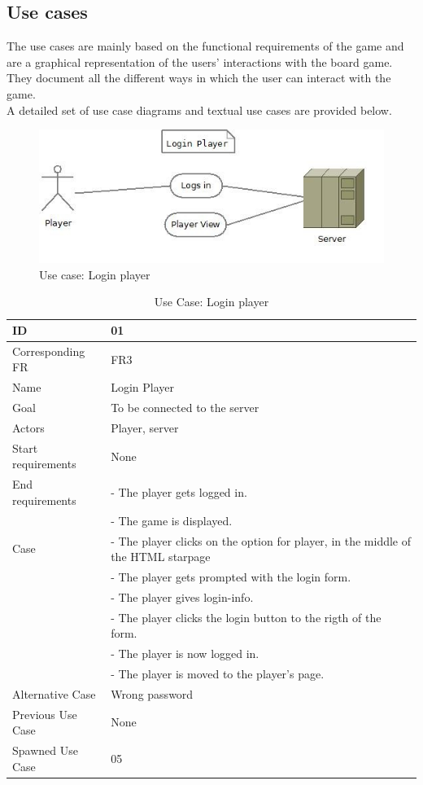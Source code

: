 \subsection{Use cases}
The use cases are mainly based on the functional requirements of the game and are a graphical representation of the users’ interactions with the board game. They document all the different ways in which the user can interact with the game. 
\\
A detailed set of use case diagrams and textual use cases are provided below.\\


\begin{figure}[H]
  \centering
    \includegraphics[width=1.0\textwidth]{img/loginplayer.jpg}
  \caption{Use case: Login player} 
  \label{fig:loginplayer}
\end{figure}


\begin{table}[H]
\begin{tabular}{|l|p{14cm}|} \hline
	\textbf{ID} & \textbf{01}\\ \hline
	Corresponding FR & FR3\\ \hline
	Name & Login Player\\ \hline
	Goal & To be connected to the server\\ \hline
	Actors & Player, server\\ \hline
	Start requirements & None\\ \hline
	End requirements & - The player gets logged in.\\
					 & - The game is displayed.\\ \hline
	Case & - The player clicks on the option for player, in the middle of the HTML starpage\\
			& - The player gets prompted with the login form. \\
		 	& - The player gives login-info.\\
			& - The player clicks the login button to the rigth of the form.\\
			& - The player is now logged in.\\ 
			& - The player is moved to the player's page. \\ \hline
	Alternative Case & Wrong password\\ \hline
	Previous Use Case & None\\ \hline
	Spawned Use Case & 05\\ \hline
\end{tabular}
\caption{Use Case: Login player}
\label{fig:usecase01table}
\end{table}


